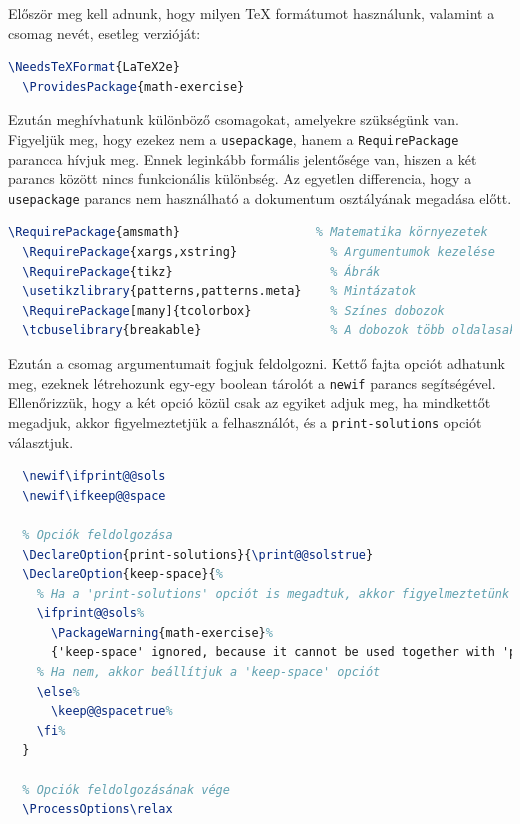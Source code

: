 Először meg kell adnunk, hogy milyen \TeX{} formátumot használunk, valamint
a csomag nevét, esetleg verzióját:

\begin{lstlisting}[language=tex,caption={Csomag információk}]
  \NeedsTeXFormat{LaTeX2e}
  \ProvidesPackage{math-exercise}
\end{lstlisting}

Ezután meghívhatunk különböző csomagokat, amelyekre szükségünk van. Figyeljük
meg, hogy ezekez nem a \texttt{usepackage}, hanem a \texttt{RequirePackage}
parancca hívjuk meg. Ennek leginkább formális jelentősége van, hiszen a két
parancs között nincs funkcionális különbség. Az egyetlen differencia, hogy
a \texttt{usepackage} parancs nem használható a dokumentum osztályának megadása
előtt.

\begin{lstlisting}[language=tex,caption={Csomagok meghívása}]
  \RequirePackage{amsmath}                   % Matematika környezetek
  \RequirePackage{xargs,xstring}             % Argumentumok kezelése
  \RequirePackage{tikz}                      % Ábrák
  \usetikzlibrary{patterns,patterns.meta}    % Mintázatok
  \RequirePackage[many]{tcolorbox}           % Színes dobozok
  \tcbuselibrary{breakable}                  % A dobozok több oldalasak is lehetnek
\end{lstlisting}

Ezután a csomag argumentumait fogjuk feldolgozni. Kettő fajta opciót adhatunk
meg, ezeknek létrehozunk egy-egy boolean tárolót a \texttt{newif} parancs
segítségével. Ellenőrizzük, hogy a két opció közül csak az egyiket adjuk meg,
ha mindkettőt megadjuk, akkor figyelmeztetjük a felhasználót, és a
\texttt{print-solutions} opciót választjuk.

\begin{lstlisting}[language=tex,caption={Opciók feldolgozása}]
  % Tárolók létrehozása
  \newif\ifprint@@sols
  \newif\ifkeep@@space

  % Opciók feldolgozása
  \DeclareOption{print-solutions}{\print@@solstrue}
  \DeclareOption{keep-space}{%
    % Ha a 'print-solutions' opciót is megadtuk, akkor figyelmeztetünk
    \ifprint@@sols%
      \PackageWarning{math-exercise}%
      {'keep-space' ignored, because it cannot be used together with 'print-solutions'}%
    % Ha nem, akkor beállítjuk a 'keep-space' opciót
    \else%
      \keep@@spacetrue%
    \fi%
  }

  % Opciók feldolgozásának vége
  \ProcessOptions\relax
\end{lstlisting}


